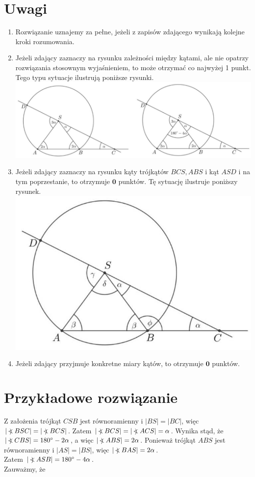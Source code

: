 \documentclass[10pt]{article}
\newcommand\Varangle{\mathop{{<\!\!\!\!\!\text{\small)}}\:}\nolimits}
\begin{document}
\section*{Uwagi}
\begin{enumerate}
  \item Rozwiązanie uznajemy za pełne, jeżeli z zapisów zdającego wynikają kolejne kroki rozumowania.
  \item Jeżeli zdający zaznaczy na rysunku zależności między kątami, ale nie opatrzy rozwiązania stosownym wyjaśnieniem, to może otrzymać co najwyżej 1 punkt. Tego typu sytuacje ilustrują poniższe rysunki.\\
\includegraphics[max width=\textwidth, center]{2025_02_07_cbaae63d39acb23a5920g-15}
  \item Jeżeli zdający zaznaczy na rysunku kąty trójkątów $B C S, A B S$ i kąt $A S D$ i na tym poprzestanie, to otrzymuje $\mathbf{0}$ punktów. Tę sytuację ilustruje poniższy rysunek.\\
\includegraphics[max width=\textwidth, center]{2025_02_07_cbaae63d39acb23a5920g-16}
  \item Jeżeli zdający przyjmuje konkretne miary kątów, to otrzymuje $\mathbf{0}$ punktów.
\end{enumerate}

\section*{Przykładowe rozwiązanie}
Z założenia trójkąt $C S B$ jest równoramienny i $|B S|=|B C|$, więc $|\Varangle B S C|=|\Varangle B C S|$. Zatem $|\Varangle B C S|=|\Varangle A C S|=\alpha$. Wynika stąd, że $|\Varangle C B S|=180^{\circ}-2 \alpha$, a więc $|\Varangle A B S|=2 \alpha$. Ponieważ trójkąt $A B S$ jest równoramienny i $|A S|=|B S|$, więc $|\Varangle B A S|=2 \alpha$.\\
Zatem $|\Varangle A S B|=180^{\circ}-4 \alpha$.\\
Zauważmy, że
\end{document}
